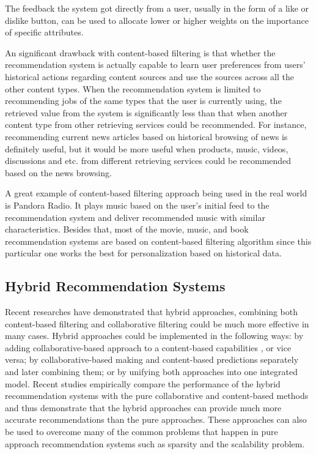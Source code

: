 \documentclass[sigconf]{acmart}
\begin{document}
\par The feedback the system got directly from a user, usually in the form of a like or dislike button, can be used to allocate lower or higher weights on the importance of specific attributes.

\par An significant drawback with content-based filtering is that whether the recommendation system is actually capable to learn user preferences from users' historical actions regarding content sources and use the sources across all the other content types. When the recommendation system is limited to recommending jobs of the same types that the user is currently using, the retrieved value from the system is significantly less than that when another content type from other retrieving services could be recommended. For instance, recommending current news articles based on historical browsing of news is definitely useful, but it would be more useful when products, music, videos, discussions and etc. from different retrieving services could be recommended based on the news browsing.

\par A great example of content-based filtering approach being used in the real world is Pandora Radio. It plays music based on the user's initial feed to the recommendation system and deliver recommended music with similar characteristics. Besides that, most of the movie, music, and book recommendation systems are based on content-based filtering algorithm since this particular one works the best for personalization based on historical data.


\subsection{Hybrid Recommendation Systems}
Recent researches have demonstrated that hybrid approaches, combining both content-based filtering and collaborative filtering could be much more effective in many cases. Hybrid approaches could be implemented in the following ways: by adding collaborative-based approach to a content-based capabilities , or vice versa; by collaborative-based making and content-based predictions separately and later combining them; or by unifying both approaches into one integrated model. Recent studies empirically compare the performance of the hybrid recommendation systems with the pure collaborative and content-based methods and thus demonstrate that the hybrid approaches can provide much more accurate recommendations than the pure approaches. These approaches can also be used to overcome many of the common problems that happen in pure approach recommendation systems such as sparsity and the scalability problem.
\end{document}
